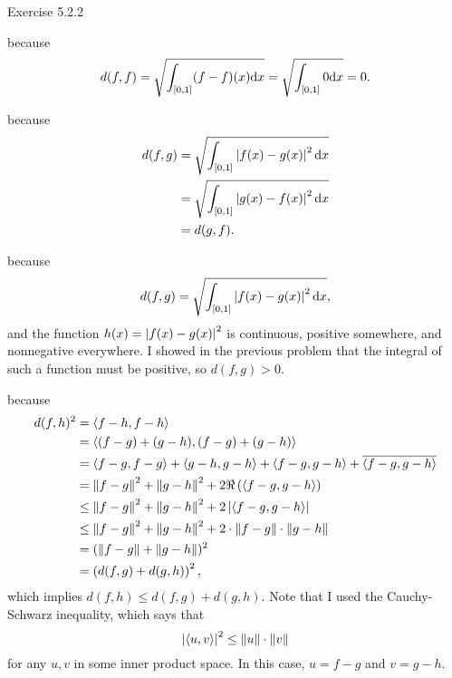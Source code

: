 \documentclass{article}
\begin{document}
\bigskip
\begin{prob}
    Exercise 5.2.2
\end{prob}
 because
\[ d(f,f)=\sqrt{\int_{[0,1]} (f-f)(x) \mathrm{d} x} = \sqrt{\int_{[0,1]} 0 \mathrm{d} x} = 0. \]
\bigskip
\par
{} because
\begin{align*}
    d(f,g) &= \sqrt{\int_{[0,1]} \left\lvert f(x)-g(x) \right\rvert^2 \mathrm{d} x} \\
           &= \sqrt{ \int_{[0,1]} \left\lvert g(x)-f(x) \right\rvert^2 \mathrm{d} x} \\
           &= d(g,f).
\end{align*}
\bigskip
\par
{} because
\[ d(f,g) = \sqrt{\int_{[0,1]} \left\lvert f(x)-g(x) \right\rvert^2 \mathrm{d} x}, \]
and the function $h(x)=\left\lvert f(x)-g(x) \right\rvert^2$ is continuous, positive somewhere, and nonnegative everywhere. I showed in the previous problem that the integral of such a function must be positive, so $d(f,g)>0$.
\bigskip
\par
{} because
\begin{align*}
    d(f,h)^2 &= \left\langle f-h,f-h \right\rangle \\
             &= \left\langle (f-g)+(g-h),(f-g)+(g-h) \right\rangle \\
             &= \left\langle f-g,f-g \right\rangle+\left\langle g-h,g-h \right\rangle+\left\langle f-g,g-h \right\rangle+\overline{\left\langle f-g,g-h \right\rangle} \\
             &= \left\lVert f-g\right\rVert^2 + \left\lVert g-h\right\rVert^2 + 2 \Re\left( \left\langle f-g,g-h \right\rangle \right) \\
             &\leq \left\lVert f-g\right\rVert^2 + \left\lVert g-h\right\rVert^2 + 2 \left\lvert  \left\langle f-g,g-h \right\rangle  \right\rvert \\
             &\leq \left\lVert f-g\right\rVert^2 + \left\lVert g-h\right\rVert^2 + 2 \cdot \left\lVert f-g\right\rVert \cdot \left\lVert g-h\right\rVert \\
             &= (\left\lVert f-g\right\rVert + \left\lVert g-h\right\rVert)^2 \\
             &= \left( d(f,g)+d(g,h) \right)^2,
\end{align*}
which implies $d(f,h) \leq d(f,g)+d(g,h)$. Note that I used the Cauchy-Schwarz inequality, which says that
\[ \left\lvert \left\langle u,v \right\rangle \right\rvert^2\leq \left\lVert u\right\rVert\cdot \left\lVert v\right\rVert \]
for any $u,v$ in some inner product space. In this case, $u=f-g$ and $v=g-h$.
\bigskip
\par
\noindent{}\bigskip\par
\end{document}
